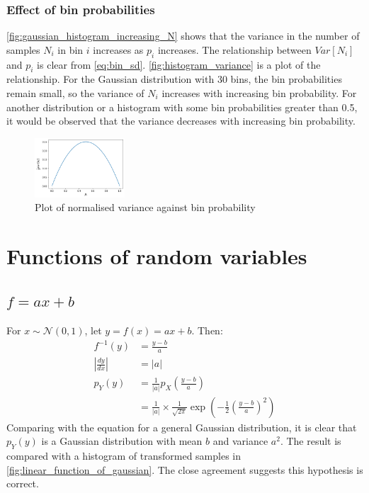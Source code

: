 \documentclass[a4paper]{article}
\begin{document}

\subsubsection{Effect of bin probabilities}
\autoref{fig:gaussian_histogram_increasing_N} shows that the variance in the number of samples $N_i$ in bin $i$
increases as $p_i$ increases.
The relationship between $Var[N_i]$ and $p_i$ is clear from \autoref{eq:bin_sd}. \autoref{fig:histogram_variance} is a
plot of the relationship. For the Gaussian distribution with 30 bins, the bin probabilities remain small, so the
variance of $N_i$ increases with increasing bin probability. For another distribution or a histogram with some bin
probabilities greater than 0.5, it would be observed that the variance decreases with increasing bin probability.

\begin{figure}[h]
    \centering
    \includegraphics[width=0.3\textwidth]{figures/histogram_variance.png}
    \caption{Plot of normalised variance against bin probability}
    \label{fig:histogram_variance}
\end{figure}



\section{Functions of random variables}

\subsection{$f = a x + b$}
For $x \sim \mathcal{N}(0, 1)$, let $y = f(x) = a x + b$. Then:
\begin{align*}
    f^{-1}(y) &= \frac{y - b}{a} \\
    \left|\frac{dy}{dx}\right| &= |a| \\
    p_Y(y) &= \frac{1}{|a|} p_X \left( \frac{y - b}{a} \right) \\
    &= \frac{1}{|a|}\times\frac{1}{\sqrt{2\pi}} \exp{\left( -\frac{1}{2} \left( \frac{y-b}{a} \right)^2 \right)}
\end{align*}
Comparing with the equation for a general Gaussian distribution, it is clear that $p_Y(y)$ is a Gaussian distribution
with mean $b$ and variance $a^2$.
The result is compared with a histogram of transformed samples in \autoref{fig:linear_function_of_gaussian}. The close
agreement suggests this hypothesis is correct.
\end{document}
